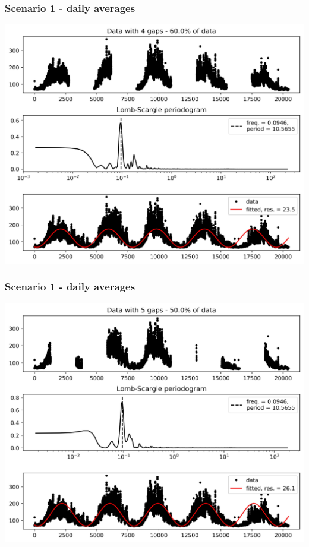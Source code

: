\documentclass{beamer}
\begin{document}
\begin{frame}
\frametitle{Scenario 1 - daily averages}
\begin{center}
\includegraphics[scale=0.55]{../scripts/dataset1/periodograms_ny2.0_model2_Ng4.jpg}
\end{center}
\end{frame}
\begin{frame}
\frametitle{Scenario 1 - daily averages}
\begin{center}
\includegraphics[scale=0.55]{../scripts/dataset1/periodograms_ny2.0_model2_Ng5.jpg}
\end{center}
\end{frame}
\end{document}
